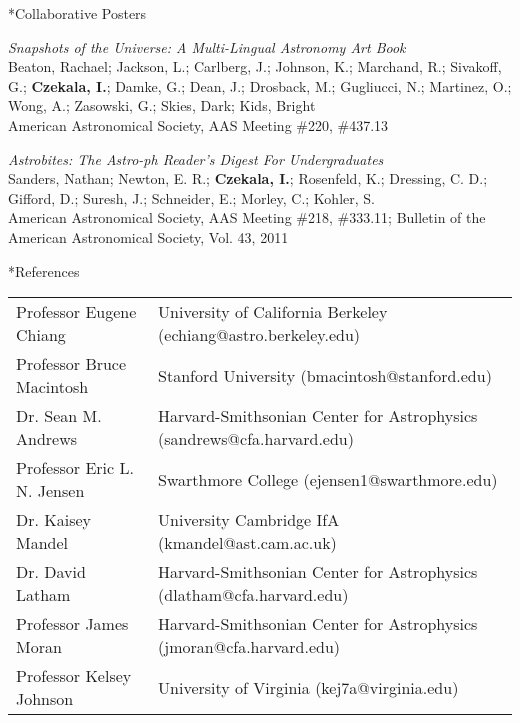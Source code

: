 \documentclass[10pt]{article}
\makeatletter
\renewcommand{\section}{\@startsection{section}{1}{0pt}{-\baselineskip}{0.5\baselineskip}{\scshape\color{myblue1}}}
\makeatother
\begin{document}
\section*{Collaborative Posters}
\begin{etaremune}
\item \emph{Snapshots of the Universe: A Multi-Lingual Astronomy Art Book}\\
Beaton, Rachael; Jackson, L.; Carlberg, J.; Johnson, K.; Marchand, R.; Sivakoff, G.; \textbf{Czekala, I.}; Damke, G.; Dean, J.; Drosback, M.; Gugliucci, N.; Martinez, O.; Wong, A.; Zasowski, G.; Skies, Dark; Kids, Bright\\
American Astronomical Society, AAS Meeting \#220, \#437.13
\item \emph{Astrobites: The Astro-ph Reader's Digest For Undergraduates}\\
Sanders, Nathan; Newton, E. R.; \textbf{Czekala, I.}; Rosenfeld, K.; Dressing, C. D.; Gifford, D.; Suresh, J.; Schneider, E.; Morley, C.; Kohler, S.\\
American Astronomical Society, AAS Meeting \#218, \#333.11; Bulletin of the American Astronomical Society, Vol. 43, 2011
\end{etaremune}

\section*{References}
\begin{tabular*}{\textwidth}{@{\hspace{10pt}}p{1.9in}l}
  Professor Eugene Chiang & University of California Berkeley (echiang@astro.berkeley.edu) \\
  Professor Bruce Macintosh & Stanford University (bmacintosh@stanford.edu) \\
  Dr. Sean M. Andrews & Harvard-Smithsonian Center for Astrophysics (sandrews@cfa.harvard.edu)\\
  Professor Eric L. N. Jensen & Swarthmore College (ejensen1@swarthmore.edu) \\
  Dr. Kaisey Mandel & University Cambridge IfA (kmandel@ast.cam.ac.uk) \\
  Dr. David Latham & Harvard-Smithsonian Center for Astrophysics (dlatham@cfa.harvard.edu) \\
  Professor James Moran & Harvard-Smithsonian Center for Astrophysics (jmoran@cfa.harvard.edu) \\
  Professor Kelsey Johnson & University of Virginia (kej7a@virginia.edu) \\
\end{tabular*}
\end{document}
